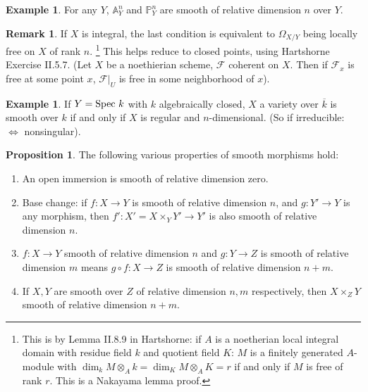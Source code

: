 \documentclass[10pt,reqno]{amsart}
\theoremstyle{definition}
\newtheorem{example}[theorem]{Example}
\newtheorem{proposition}[theorem]{Proposition}
\newtheorem{remark}[theorem]{Remark}
\theoremstyle{remark}
\numberwithin{equation}{section}
\numberwithin{theorem}{section}
\newcommand*{\red}{\textcolor{red}}
\newcommand{\spec}{\textup{Spec }}
\newcommand{\FF}{{\mathscr F}}
\newcommand{\A}{{\mathbb A}}
\newcommand{\PP}{{\mathbb P}}
\begin{document}
\begin{example} For any $Y$, $\A^n_Y$ and $\PP^n_Y$ are smooth of relative dimension $n$ over $Y$.
\end{example}

\begin{remark} If $X$ is integral, the last condition is equivalent to $\Omega_{X/Y}$ being locally free on $X$ of rank $n$. \footnote{This is by Lemma II.8.9 in Hartshorne: if $A$ is a noetherian local integral domain with residue field $k$ and quotient field $K$: $M$ is a finitely generated $A$-module with $\dim_k M \otimes_A k = \dim_K M \otimes_A K = r$ if and only if $M$ is free of rank $r$. This is a Nakayama lemma proof.} This helps reduce to closed points, using Hartshorne Exercise II.5.7. (Let $X$ be a noethierian scheme, $\FF$ coherent on $X$. Then if $\FF_x$ is free at some point $x$, $\FF|_U$ is free in some neighborhood of $x$).
\end{remark}

\begin{example} If $Y = \spec k$ with $k$ algebraically closed, $X$ a variety over $\overline{k}$ is smooth over $k$ if and only if $X$ is regular and $n$-dimensional. (So if irreducible: $\iff$ nonsingular).
\end{example}

\begin{proposition} The following various properties of smooth morphisms hold:
\begin{enumerate}
\item  An open immersion is smooth of relative dimension zero.
\item  Base change: if $f: X \to Y$ is smooth of relative dimension $n$, and $g: Y' \to Y$ is any morphism, then $f': X' = X \times_Y Y' \to Y'$ is also smooth of relative dimension $n$.
\item $f:X \to Y$ smooth of relative dimension $n$ and $g: Y \to Z$ is smooth of relative dimension $m$ means $g \circ f: X \to Z$ is smooth of relative dimension $n+m$.
\item If $X,Y$ are smooth over $Z$ of relative dimension $n,m$ respectively, then $X \times_Z Y$ smooth of relative dimension $n+m$.
\end{enumerate}
\end{proposition}

\end{document}
